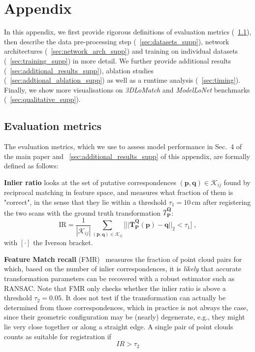 \section{Appendix}
In this appendix, we first provide rigorous definitions of evaluation metrics (~\cref{sec:evaluation_metrics_supp}), then describe the data pre-processing step (~\cref{sec:datasets_supp}), network architectures (~\cref{sec:network_arch_supp}) and training on individual datasets (~\cref{sec:training_supp}) in more detail. We further provide additional results (~\cref{sec:additional_results_supp}), ablation studies (~\cref{sec:addtional_ablation_supp}) as well as a runtime analysis (~\cref{sec:timing}). Finally, we show more visualisations on \emph{3DLoMatch} and \emph{ModelLoNet} benchmarks (~\cref{sec:qualitative_supp}). 


\subsection{Evaluation metrics}
\label{sec:evaluation_metrics_supp}
The evaluation metrics, which we use to assess model performance in Sec.~4 of the main paper and ~\cref{sec:additional_results_supp} of this appendix, are formally defined as follows:

\textbf{Inlier ratio} looks at the set of putative correspondences $(\mathbf{p}, \mathbf{q}) \in \mathcal{K}_{i j}$ found by reciprocal matching%
in feature space, and measures what fraction of them is "correct", in the sense that they lie within a threshold $\tau_1\!=\!10\,$cm after registering the two scans with the ground truth transformation $\overbar{T}_\mathbf{P}^ \mathbf{Q}$:
\begin{equation}
\mathrm{IR} = \frac{1}{\left|\mathcal{K}_{ij}\right|} \sum_{\left(\mathbf{p}, \mathbf{q}\right) \in \mathcal{K}_{ij}} \big[ ||\overbar{\mathbf{T}}_\mathbf{P}^ \mathbf{Q}(\mathbf{p})-\mathbf{q}||_2<\tau_{1} \big]  \;,
\end{equation}
with $[\cdot]$ the Iverson bracket.

\textbf{Feature Match recall} (FMR)~\cite{deng2018ppfnet} measures the fraction of point cloud pairs for which, based on the number of inlier correspondences, it is \emph{likely} that accurate transformation parameters can be recovered with a robust estimator such as RANSAC.
Note that FMR only checks whether the inlier ratio is above a threshold $\tau_2=0.05$. It does not test if the transformation can actually be determined from those correspondences, which in practice is not always the case, since their geometric configuration may be (nearly) degenerate, e.g., they might lie very close together or along a straight edge.
A single pair of point clouds counts as suitable for registration if%
\begin{equation}
    IR > \tau_2
\end{equation}

